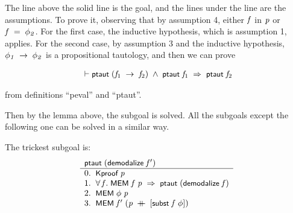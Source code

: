 \documentclass[letterpaper]{article}
\renewcommand{\HOLConst}[1]{{\textsf{\upshape\small #1}}}
\renewcommand{\HOLinline}[1]{\ensuremath{#1}}
\newenvironment{holmath}{\begin{displaymath}\begin{array}{l}}{\end{array}\end{displaymath}\ignorespacesafterend}
\begin{document}
The line above the solid line is the goal, and the lines under the line are the assumptions. To prove it, observing that by assumption 4, either \HOLinline{\HOLFreeVar{f}} in \HOLinline{\HOLFreeVar{p}} or \HOLinline{\HOLFreeVar{f}\;\HOLSymConst{=}\;\HOLFreeVar{\ensuremath{\phi\sb{2}}}}. For the first case, the inductive hypothesis, which is assumption 1, applies. For the second case, by assumption 3 and the inductive hypothesis, \HOLinline{\HOLFreeVar{\ensuremath{\phi\sb{1}}}\;\HOLSymConst{\ensuremath{\rightarrow}}\;\HOLFreeVar{\ensuremath{\phi\sb{2}}}} is a propositional tautology, and then we can prove

\begin{holmath}
  \ensuremath{\HOLTokenTurnstile}\HOLConst{ptaut}\;(\HOLFreeVar{f\sb{\mathrm{1}}}\;\HOLSymConst{\ensuremath{\rightarrow}}\;\HOLFreeVar{f\sb{\mathrm{2}}})\;\HOLSymConst{\HOLTokenConj{}}\;\HOLConst{ptaut}\;\HOLFreeVar{f\sb{\mathrm{1}}}\;\HOLSymConst{\HOLTokenImp{}}\;\HOLConst{ptaut}\;\HOLFreeVar{f\sb{\mathrm{2}}}
\end{holmath}
  
from definitions ``peval'' and ``ptaut''.

Then by the lemma above, the subgoal is solved. All the subgoals except the following one can be solved in a similar way.

The trickest subgoal is:
\[
\begin{array}{l}
\HOLinline{\HOLConst{ptaut}\;(\HOLConst{demodalize}\;\HOLFreeVar{f\sp{\prime}})}\\ \hline
0. \;\;\HOLinline{\HOLConst{Kproof}\;\HOLFreeVar{p}}\\
1. \;\;\HOLinline{\HOLSymConst{\HOLTokenForall{}}\HOLBoundVar{f}.\;\HOLConst{MEM}\;\HOLBoundVar{f}\;\HOLFreeVar{p}\;\HOLSymConst{\HOLTokenImp{}}\;\HOLConst{ptaut}\;(\HOLConst{demodalize}\;\HOLBoundVar{f})}\\
2. \;\;\HOLinline{\HOLConst{MEM}\;\HOLFreeVar{\ensuremath{\phi}}\;\HOLFreeVar{p}}\\
3. \;\;\HOLinline{\HOLConst{MEM}\;\HOLFreeVar{f\sp{\prime}}\;(\HOLFreeVar{p}\;\HOLSymConst{\HOLTokenDoublePlus}\;[\HOLConst{subst}\;\HOLFreeVar{f}\;\HOLFreeVar{\ensuremath{\phi}}])}
\end{array}
\]
\end{document}
